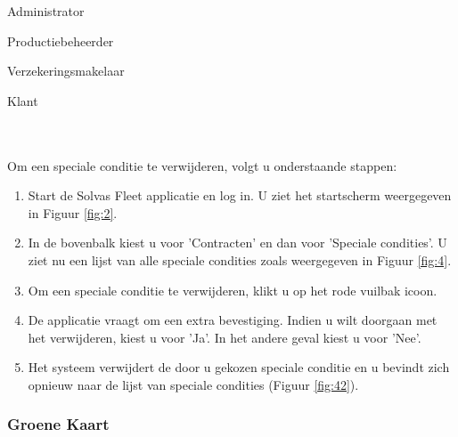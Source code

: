 \documentclass[11pt,openany]{article}
\newcommand{\cmark}{\ding{51}}%
\newcommand{\xmark}{\ding{55}}%
\newcommand{\done}{\rlap{$\square$}{\raisebox{2pt}{\large\hspace{1pt}\cmark}}%
	\hspace{-2.5pt}}
\newcommand{\wontfix}{\rlap{$\square$}{\large\hspace{1pt}\xmark}}
\begin{document}
\begin{todolist}
	\item[\done] Administrator
	\item[\done] Productiebeheerder
	\item[\done] Verzekeringsmakelaar
	\item[\wontfix] Klant 
\end{todolist}
\\
\\
Om een speciale conditie te verwijderen, volgt u onderstaande stappen:
\begin{enumerate}
	\item Start de Solvas Fleet applicatie en log in. U ziet het startscherm weergegeven in Figuur \ref{fig:2}.
	\item In de bovenbalk kiest u voor 'Contracten' en dan voor 'Speciale condities'. U ziet nu een lijst van alle speciale condities zoals weergegeven in Figuur \ref{fig:4}.
	\item Om een speciale conditie te verwijderen, klikt u op het rode vuilbak icoon. 
	\item De applicatie vraagt om een extra bevestiging. Indien u wilt doorgaan met het verwijderen, kiest u voor 'Ja'. In het andere geval kiest u voor 'Nee'.
	\item Het systeem verwijdert de door u gekozen speciale conditie en u bevindt zich opnieuw naar de lijst van speciale condities (Figuur \ref{fig:42}).
\end{enumerate}

\subsubsection{Groene Kaart}
\end{document}
